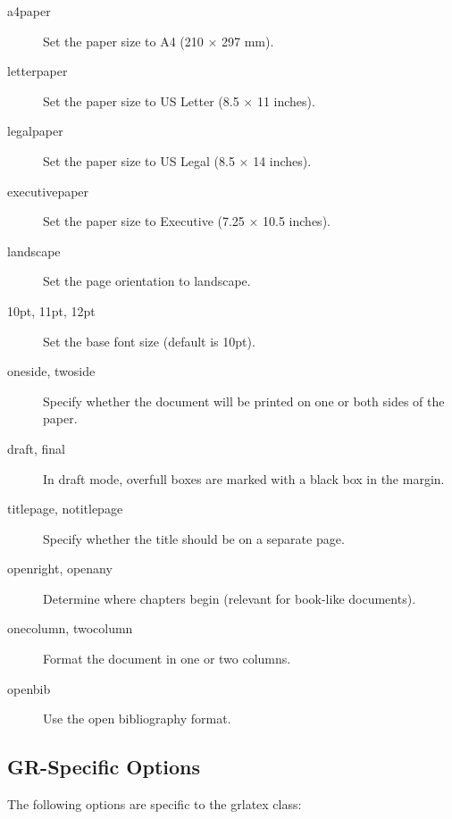 \documentclass{ltxdoc}
\begin{document}
\begin{description}
\item[a4paper] Set the paper size to A4 (210 × 297 mm).
\item[letterpaper] Set the paper size to US Letter (8.5 × 11 inches).
\item[legalpaper] Set the paper size to US Legal (8.5 × 14 inches).
\item[executivepaper] Set the paper size to Executive (7.25 × 10.5 inches).
\item[landscape] Set the page orientation to landscape.
\item[10pt, 11pt, 12pt] Set the base font size (default is 10pt).
\item[oneside, twoside] Specify whether the document will be printed on one or both sides of the paper.
\item[draft, final] In draft mode, overfull boxes are marked with a black box in the margin.
\item[titlepage, notitlepage] Specify whether the title should be on a separate page.
\item[openright, openany] Determine where chapters begin (relevant for book-like documents).
\item[onecolumn, twocolumn] Format the document in one or two columns.
\item[openbib] Use the open bibliography format.
\end{description}

\subsection{GR-Specific Options}

The following options are specific to the \textsf{grlatex} class:
\end{document}
